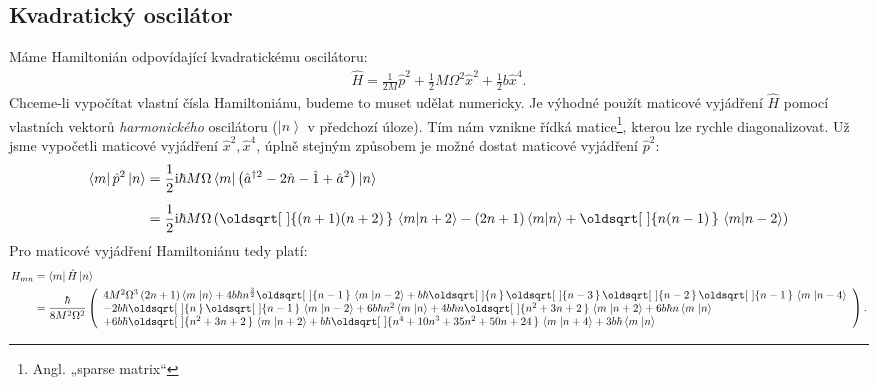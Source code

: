 \documentclass[10pt,a4paper]{article}
\renewcommand*{\sqrt}[2][\ ]{\oldsqrt[#1]{#2\,}\,}
\newcommand{\const}[1]{\text{#1}}
\newcommand{\bra}[1]{\left< #1 \right|}
\newcommand{\ket}[1]{\left| #1 \right>}
\newcommand{\braket}[2]{\left< #1 \middle| #2 \right>}
\renewcommand{\i}{\const{i}}
\begin{document}
\subsection{Kvadratický oscilátor}
Máme Hamiltonián odpovídající kvadratickému oscilátoru:
\begin{align*}
    \hat{H} = \frac{1}{2M} \hat{p}^2 + \frac{1}{2} M \Omega^2 \hat{x}^2 + \frac{1}{2} b \hat{x}^4.
\end{align*}
Chceme-li vypočítat vlastní čísla Hamiltoniánu, budeme to muset udělat numericky. Je výhodné použít maticové vyjádření $\hat{H}$ pomocí vlastních vektorů \textit{harmonického} oscilátoru ($\ket{n}$ v předchozí úloze). Tím nám vznikne řídká matice\footnote{Angl. „sparse matrix“}, kterou lze rychle diagonalizovat.
Už jsme vypočetli maticové vyjádření $\hat{x}^2, \hat{x}^4$, úplně stejným způsobem je možné dostat maticové vyjádření $\hat{p}^2$:
\begin{align*}
    \bra{m} \hat{p}^2 \ket{n}
    &= \frac{1}{2} \i \hbar M \Omega \bra{m} \left(
        \hat{a}^{\dagger 2} - 2\hat{n} - \hat{1} + \hat{a}^2
    \right) \ket{n}
    \\[5pt]
    &= \frac{1}{2} \i \hbar M \Omega \left(
        \sqrt{(n+1)(n+2)} \braket{m}{n+2}
        -(2n+1)\braket{m}{n}
        +\sqrt{n(n-1)} \braket{m}{n-2}
    \right)
\end{align*}
Pro maticové vyjádření Hamiltoniánu tedy platí:
\begin{align*}
    H_{mn} &= \bra{m} \hat{H} \ket{n} \\
    &= \frac{\hbar}{8 M^{2} \Omega^{2}} \left(
        \begin{array}{l}
            4 M^{2} \Omega^{3} \left(2 n + 1\right) \left\langle m \right. {\left|n\right\rangle } + 4 b \hbar n^{\frac{3}{2}} \sqrt{n - 1} \left\langle m \right. {\left|n - 2\right\rangle } + b \hbar \sqrt{n} \sqrt{n - 3} \sqrt{n - 2} \sqrt{n - 1} \left\langle m \right. {\left|n - 4\right\rangle }
            \\
            - 2 b \hbar \sqrt{n} \sqrt{n - 1} \left\langle m \right. {\left|n - 2\right\rangle } + 6 b \hbar n^{2} \left\langle m \right. {\left|n\right\rangle } + 4 b \hbar n \sqrt{n^{2} + 3 n + 2} \left\langle m \right. {\left|n + 2\right\rangle } + 6 b \hbar n \left\langle m \right. {\left|n\right\rangle }
            \\
            + 6 b \hbar \sqrt{n^{2} + 3 n + 2} \left\langle m \right. {\left|n + 2\right\rangle } + b \hbar \sqrt{n^{4} + 10 n^{3} + 35 n^{2} + 50 n + 24} \left\langle m \right. {\left|n + 4\right\rangle } + 3 b \hbar \left\langle m \right. {\left|n\right\rangle }
        \end{array}
    \right).
\end{align*}
\end{document}
